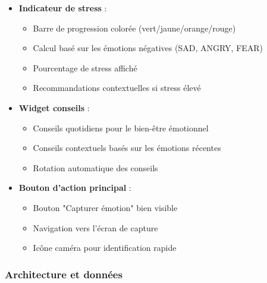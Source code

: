 \documentclass[a4paper,11pt]{report}
\begin{document}
\begin{itemize}
    \item \textbf{Indicateur de stress} :
    \begin{itemize}
        \item Barre de progression colorée (vert/jaune/orange/rouge)
        \item Calcul basé sur les émotions négatives (SAD, ANGRY, FEAR)
        \item Pourcentage de stress affiché
        \item Recommandations contextuelles si stress élevé
    \end{itemize}
    
    \item \textbf{Widget conseils} :
    \begin{itemize}
        \item Conseils quotidiens pour le bien-être émotionnel
        \item Conseils contextuels basés sur les émotions récentes
        \item Rotation automatique des conseils
    \end{itemize}
    
    \item \textbf{Bouton d'action principal} :
    \begin{itemize}
        \item Bouton "Capturer émotion" bien visible
        \item Navigation vers l'écran de capture
        \item Icône caméra pour identification rapide
    \end{itemize}
\end{itemize}

\subsubsection{Architecture et données}
\end{document}

